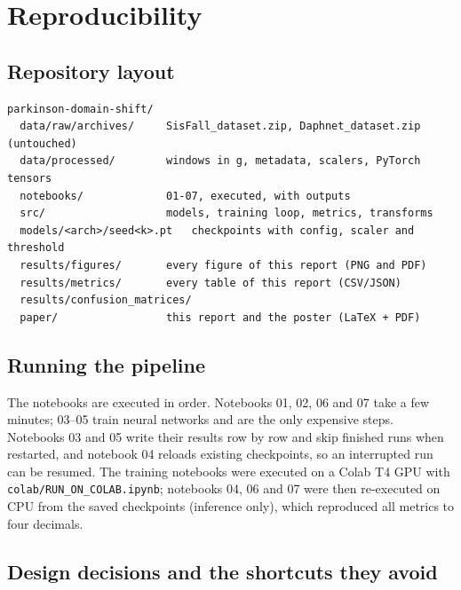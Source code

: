 \chapter{Reproducibility}
\label{app:repro}

\section{Repository layout}

{\footnotesize
\begin{verbatim}
parkinson-domain-shift/
  data/raw/archives/     SisFall_dataset.zip, Daphnet_dataset.zip (untouched)
  data/processed/        windows in g, metadata, scalers, PyTorch tensors
  notebooks/             01-07, executed, with outputs
  src/                   models, training loop, metrics, transforms
  models/<arch>/seed<k>.pt   checkpoints with config, scaler and threshold
  results/figures/       every figure of this report (PNG and PDF)
  results/metrics/       every table of this report (CSV/JSON)
  results/confusion_matrices/
  paper/                 this report and the poster (LaTeX + PDF)
\end{verbatim}
}

\section{Running the pipeline}

The notebooks are executed in order. Notebooks 01, 02, 06 and 07 take a few minutes; 03--05 train
neural networks and are the only expensive steps. Notebooks 03 and 05 write their results row by
row and skip finished runs when restarted, and notebook 04 reloads existing checkpoints, so an
interrupted run can be resumed. The training notebooks were executed on a Colab T4 GPU with
\texttt{colab/RUN\_ON\_COLAB.ipynb}; notebooks 04, 06 and 07 were then re-executed on CPU from the
saved checkpoints (inference only), which reproduced all metrics to four decimals.

\section{Design decisions and the shortcuts they avoid}


